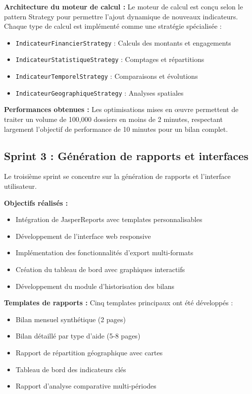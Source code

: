 \textbf{Architecture du moteur de calcul :}
Le moteur de calcul est conçu selon le pattern Strategy pour permettre l'ajout dynamique de nouveaux indicateurs. Chaque type de calcul est implémenté comme une stratégie spécialisée :

\begin{itemize}
    \item \texttt{IndicateurFinancierStrategy} : Calculs des montants et engagements
    \item \texttt{IndicateurStatistiqueStrategy} : Comptages et répartitions
    \item \texttt{IndicateurTemporelStrategy} : Comparaisons et évolutions
    \item \texttt{IndicateurGeographiqueStrategy} : Analyses spatiales
\end{itemize}

\textbf{Performances obtenues :}
Les optimisations mises en œuvre permettent de traiter un volume de 100,000 dossiers en moins de 2 minutes, respectant largement l'objectif de performance de 10 minutes pour un bilan complet.

\subsection{Sprint 3 : Génération de rapports et interfaces}

Le troisième sprint se concentre sur la génération de rapports et l'interface utilisateur.

\medskip

\textbf{Objectifs réalisés :}
\begin{itemize}
    \item Intégration de JasperReports avec templates personnalisables
    \item Développement de l'interface web responsive
    \item Implémentation des fonctionnalités d'export multi-formats
    \item Création du tableau de bord avec graphiques interactifs
    \item Développement du module d'historisation des bilans
\end{itemize}

\textbf{Templates de rapports :}
Cinq templates principaux ont été développés :
\begin{itemize}
    \item Bilan mensuel synthétique (2 pages)
    \item Bilan détaillé par type d'aide (5-8 pages)
    \item Rapport de répartition géographique avec cartes
    \item Tableau de bord des indicateurs clés
    \item Rapport d'analyse comparative multi-périodes
\end{itemize}

